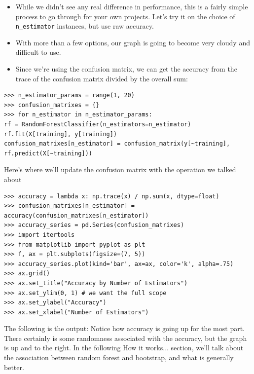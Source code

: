 \documentclass[SKL-MASTER.tex]{subfiles}
\begin{document}
\begin{itemize}
\item While we didn't see any real difference in performance, this is a fairly simple process to go
through for your own projects. Let's try it on the choice of \texttt{n\_estimator} instances, but use
raw accuracy. 
\item With more than a few options, our graph is going to become very cloudy and
difficult to use.
\item Since we're using the confusion matrix, we can get the accuracy from the trace of the
confusion matrix divided by the overall sum:
\end{itemize}

\begin{framed}
	\begin{verbatim}
>>> n_estimator_params = range(1, 20)
>>> confusion_matrixes = {}
>>> for n_estimator in n_estimator_params:
rf = RandomForestClassifier(n_estimators=n_estimator)
rf.fit(X[training], y[training])
confusion_matrixes[n_estimator] = confusion_matrix(y[~training],
rf.predict(X[~training]))
\end{verbatim}
\end{framed}
Here's where we'll update the confusion matrix with the
operation we talked about
\begin{framed}
	\begin{verbatim}
>>> accuracy = lambda x: np.trace(x) / np.sum(x, dtype=float)
>>> confusion_matrixes[n_estimator] =
accuracy(confusion_matrixes[n_estimator])
>>> accuracy_series = pd.Series(confusion_matrixes)
>>> import itertools
>>> from matplotlib import pyplot as plt
>>> f, ax = plt.subplots(figsize=(7, 5))
>>> accuracy_series.plot(kind='bar', ax=ax, color='k', alpha=.75)
>>> ax.grid()
>>> ax.set_title("Accuracy by Number of Estimators")
>>> ax.set_ylim(0, 1) # we want the full scope
>>> ax.set_ylabel("Accuracy")
>>> ax.set_xlabel("Number of Estimators")
\end{verbatim}
\end{framed}
The following is the output:
Notice how accuracy is going up for the most part. There certainly is some randomness
associated with the accuracy, but the graph is up and to the right. In the following How it
works... section, we'll talk about the association between random forest and bootstrap,
and what is generally better.
\end{document}
